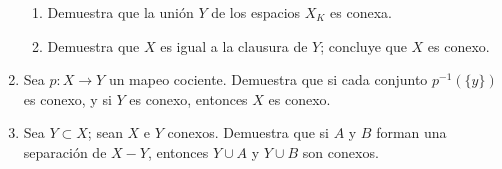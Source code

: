 \documentclass[11pt]{article}
\begin{document}
\begin{enumerate}
\begin{enumerate}
        \item Demuestra que la unión $Y$ de los espacios $X_K$ es conexa.
        
        \item Demuestra que $X$ es igual a la clausura de $Y$; concluye que $X$ es conexo.
    \end{enumerate}
    
    \item Sea $p : X \to Y$ un mapeo cociente. Demuestra que si cada conjunto $p^{-1}(\{y\})$ es conexo, y si $Y$ es conexo, entonces $X$ es conexo.
    
    \item Sea $Y \subset X$; sean $X$ e $Y$ conexos. Demuestra que si $A$ y $B$ forman una separación de $X - Y$, entonces $Y \cup A$ y $Y \cup B$ son conexos.

\end{enumerate}
   
\end{document}
